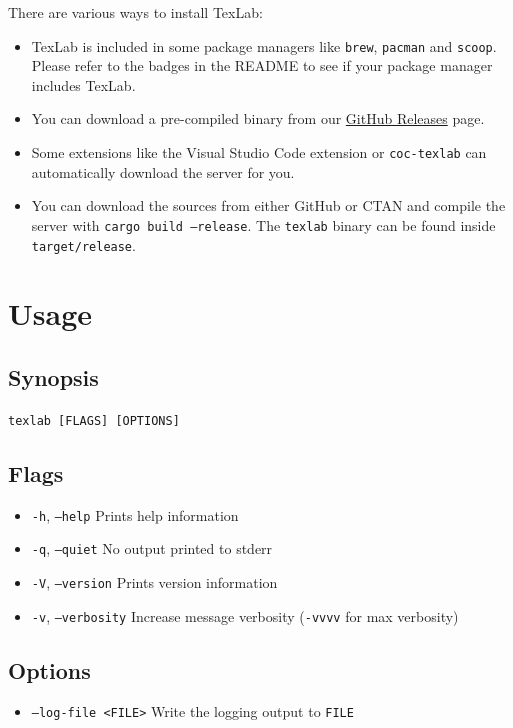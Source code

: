 \documentclass{article}
\begin{document}
There are various ways to install TexLab:
\begin{itemize}
    \item 
        TexLab is included in some package managers like \texttt{brew},
        \texttt{pacman} and \texttt{scoop}.
        Please refer to the badges in the README to see if your package manager
        includes TexLab.
    \item
        You can download a pre-compiled binary from our 
        \href{https://github.com/latex-lsp/texlab/releases}{GitHub Releases} page.
    \item
        Some extensions like the Visual Studio Code extension or
        \texttt{coc-texlab} can automatically download the server for you.
    \item
        You can download the sources from either GitHub or CTAN
        and compile the server with \texttt{cargo build --release}.
        The \texttt{texlab} binary can be found inside \texttt{target/release}.    
\end{itemize}

\section{Usage}

\subsection{Synopsis}

\texttt{texlab [FLAGS] [OPTIONS]}

\subsection{Flags}

\begin{itemize}
    \item \texttt{-h}, \texttt{--help} Prints help information
    \item \texttt{-q}, \texttt{--quiet} No output printed to stderr
    \item \texttt{-V}, \texttt{--version} Prints version information
    \item \texttt{-v}, \texttt{--verbosity} Increase message verbosity (\texttt{-vvvv} for max verbosity)
\end{itemize}

\subsection{Options}

\begin{itemize}
    \item \texttt{--log-file <FILE>} Write the logging output to \texttt{FILE}
\end{itemize}
\end{document}
